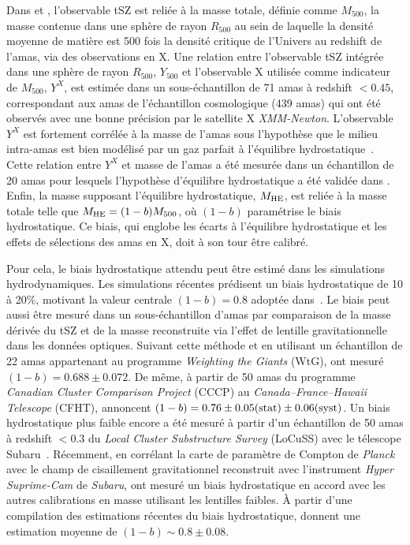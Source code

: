 Dans \citet{Planck_2014_SZ_Cosmo} et \citet{Planck_2016_SZ_cosmo},
l'observable tSZ est reliée à la masse totale, définie comme
$M_{500}$, la masse contenue dans une sphère de rayon $R_{500}$ au
sein de laquelle la densité moyenne de matière est 500 fois la
densité critique de l'Univers au redshift de l'amas, via des
observations en X. 
Une relation entre l'observable tSZ intégrée dans une sphère de rayon
$R_{500}$, $Y_{500}$ et l'observable X utilisée comme indicateur de 
$M_{500}$, $Y^{X}$, est estimée dans un sous-échantillon de 71 amas à
redshift $<0.45$, correspondant aux amas de l'échantillon cosmologique
(439 amas) qui ont été observés avec une bonne précision par le satellite
X \emph{XMM-Newton}. L'observable $Y^{X}$ est fortement corrélée à la
masse de l'amas sous l'hypothèse que le milieu intra-amas est bien
modélisé par un gaz parfait à l'équilibre
hydrostatique~\citep{Kravtsov2006}. Cette relation entre $Y^{X}$ et
masse de l'amas a été mesurée dans un échantillon de 20 amas pour lesquels
l'hypothèse d'équilibre hydrostatique a été validée dans \citet{Arnaud2010}.
Enfin, la masse supposant l'équilibre hydrostatique, $M_{\rm{HE}}$,
est reliée à la masse totale telle que $M_{\rm{HE}} = (1-b)M_{500}$,
où $(1-b)$ paramétrise le biais hydrostatique. Ce biais, qui englobe les écarts à
l'équilibre hydrostatique et les effets de sélections des amas en X, doit à son
tour être calibré.

Pour cela, le biais hydrostatique attendu peut être
estimé dans les simulations hydrodynamiques. Les simulations récentes
prédisent un biais hydrostatique de 10 à 20\%, motivant la valeur
centrale $(1 - b) = 0.8$ adoptée dans~\citet{Planck_2014_SZ_Cosmo}. Le
biais peut aussi être mesuré dans un sous-échantillon d'amas par
comparaison de la masse dérivée du tSZ et de la masse reconstruite via
l'effet de lentille gravitationnelle dans les données
optiques. Suivant cette méthode et en utilisant un échantillon de 22
amas appartenant au programme \emph{Weighting the Giants}
(WtG), \citet{vonderLinden2014} ont mesuré $(1-b) = 0.688 \pm
0.072$. De même, à partir de 50 amas du programme \emph{Canadian
Cluster Comparison Project} (CCCP) au \emph{Canada–France–Hawaii
Telescope} (CFHT), \citet{Hoekstra2015} annoncent
$(1-b) = 0.76 \pm 0.05\rm{(stat)} \pm 0.06\rm{(syst)}$. Un biais
hydrostatique plus faible encore a été mesuré à partir d'un
échantillon de 50 amas à redshift $<0.3$ du \emph{Local Cluster
Substructure Survey} (LoCuSS) avec le télescope
Subaru~\citep{Smith2016}. Récemment, en corrélant la carte de
paramètre de Compton de \emph{Planck} avec le champ de cisaillement
gravitationnel reconstruit avec l'instrument \emph{Hyper Suprime-Cam}
de \emph{Subaru}, \citet{Osato2019} ont mesuré un biais hydrostatique
en accord avec les autres calibrations en masse utilisant les lentilles
faibles. \`A partir d'une compilation des estimations récentes 
du biais hydrostatique, \citet{Salvati2018}
donnent une estimation moyenne de $(1-b) \sim 0.8 \pm 0.08$.


